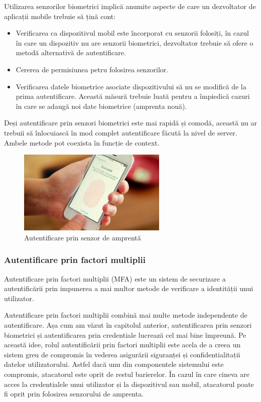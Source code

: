 \documentclass[12pt]{article}
\begin{document}
Utilizarea senzorilor biometrici implică anumite aspecte de care un dezvoltator de
aplicații mobile trebuie să țină cont:

\begin{itemize}
    \item Verificarea ca dispozitivul mobil este încorporat cu senzorii folosiți,
    în cazul în care un dispozitiv nu are senzorii biometrici, dezvoltator trebuie 
    să ofere o metodă alternativă de autentificare. \cite{enisa-2017}
    \item Cererea de permisiunea petru folosirea senzorilor.
    \item Verificarea datele biometrice asociate dispozitivului să nu se modifică
    de la prima autentificare. Această măsură trebuie luată pentru a împiedică cazuri
    în care se adaugă noi date biometrice (amprenta nouă).
\end{itemize}

Deși autentificare prin senzori biometrici este mai rapidă și comodă, această nu ar trebuii
să înlocuiască în mod complet autentificare făcută la nivel de server. 
Ambele metode pot coexista în funcție de context.

\begin{figure}[H]
\centering
\includegraphics[height=4cm]{fingerprint-smartphone_0.jpg}
\caption{Autentificare prin senzor de amprentă}
\end{figure}

\subsubsection{Autentificare prin factori multiplii}

Autentificare prin factori multiplii (MFA) este un sistem de securizare a autentificării
prin impunerea a mai multor metode de verificare a identității unui utilizator.

Autentificare prin factori multiplii combină mai multe metode independente de autentificare.
Așa cum am văzut în capitolul anterior, autentificarea prin senzori biometrici și autentificarea
prin credentiale lucrează cel mai bine împreună. Pe această idee, rolul autentificării prin factori
multiplii este acela de a creea un sistem greu de compromis în vederea asigurării siguranței și
confidentialitații datelor utilizatorului. Astfel dacă unu din componentele sistemului este compromis,
atacatorul este oprit de restul barierelor. În cazul în care cineva are acces la credentialele unui 
utilizator și la dispozitivul sau mobil, atacatorul poate fi oprit prin folosirea senzorului de amprenta.
\end{document}
